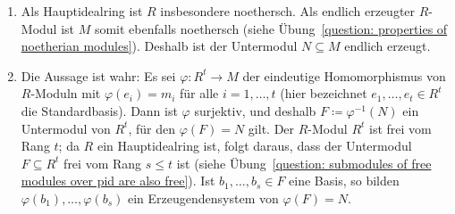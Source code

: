 \begin{solution}
  \begin{enumerate}
    \item
      Als Hauptidealring ist $R$ insbesondere noethersch.
      Als endlich erzeugter $R$-Modul ist $M$ somit ebenfalls noethersch (siehe Übung~\ref{question: properties of noetherian modules}).
      Deshalb ist der Untermodul $N \subseteq M$ endlich erzeugt.
    \item
      Die Aussage ist wahr:
      Es sei $\varphi \colon R^t \to M$ der eindeutige Homomorphismus von $R$-Moduln mit $\varphi(e_i) = m_i$ für alle $i = 1, \dotsc, t$ (hier bezeichnet $e_1, \dotsc, e_t \in R^t$ die Standardbasis).
      Dann ist $\varphi$ surjektiv, und deshalb $F \coloneqq \varphi^{-1}(N)$ ein Untermodul von $R^t$, für den $\varphi(F) = N$ gilt.
      Der $R$-Modul $R^t$ ist frei vom Rang $t$; da $R$ ein Hauptidealring ist, folgt daraus, dass der Untermodul $F \subseteq R^t$ frei vom Rang $s \leq t$ ist (siehe Übung~\ref{question: submodules of free modules over pid are also free}).
      Ist $b_1, \dotsc, b_s \in F$ eine Basis, so bilden $\varphi(b_1), \dotsc, \varphi(b_s)$ ein Erzeugendensystem von $\varphi(F) = N$.
  \end{enumerate}
\end{solution}


